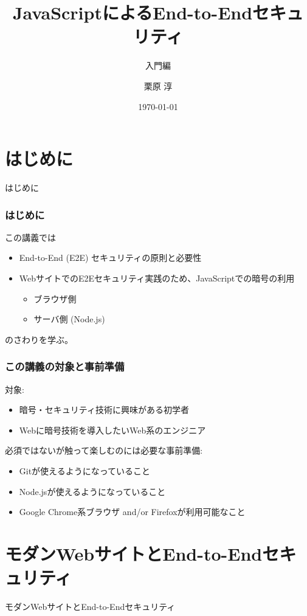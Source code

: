\documentclass[12pt,dvipdfmx]{beamer}
\title[E2E Security with JS]{JavaScriptによるEnd-to-Endセキュリティ}
\subtitle{入門編}
\author[Jun Kurihara]{栗原 淳}
\institute[]{}
\date[\today]{\today}
\begin{document}
\begin{frame}
\titlepage
\end{frame}

\section{はじめに}
\begin{frame}
 \centering
 {\Large はじめに}
\end{frame}

\begin{frame}
\frametitle{はじめに}
この講義では
\begin{itemize}
 \item End-to-End (E2E) セキュリティの原則と必要性
 \item WebサイトでのE2Eセキュリティ実践のため、JavaScriptでの暗号の利用
\begin{itemize}
 \item ブラウザ側
 \item サーバ側 (Node.js)
\end{itemize}
\end{itemize}
のさわりを学ぶ。
\end{frame}

\begin{frame}
\frametitle{この講義の対象と事前準備}
対象:
\begin{itemize}
\item 暗号・セキュリティ技術に興味がある初学者
\item Webに暗号技術を導入したいWeb系のエンジニア
\end{itemize}

\vspace{2ex}

必須ではないが触って楽しむのには必要な事前準備:
\begin{itemize}
\item Gitが使えるようになっていること
\item Node.jsが使えるようになっていること
\item Google Chrome系ブラウザ and/or Firefoxが利用可能なこと
\end{itemize}
\end{frame}


\section{モダンWebサイトとEnd-to-Endセキュリティ}
\begin{frame}
 \centering
 {\Large モダンWebサイトとEnd-to-Endセキュリティ}
\end{frame}
\end{document}
